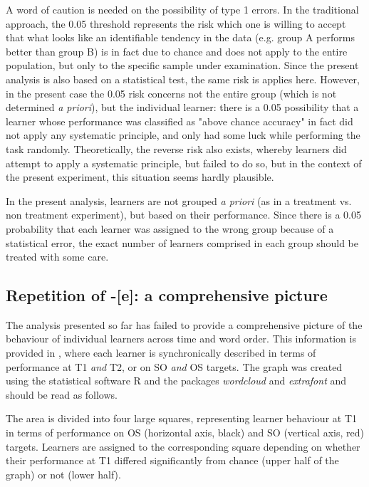 A word of caution is needed on the possibility of type 1 errors. In the traditional approach, the 0.05 threshold represents the risk which one is willing to accept that what looks like an identifiable tendency in the data (e.g. group A performs better than group B) is in fact due to chance and does not apply to the entire population, but only to the specific sample under examination. Since the present analysis is also based on a statistical test, the same risk is applies here. However, in the present case the 0.05 risk concerns not the entire group (which is not determined \textit{a priori}), but the individual learner: there is a 0.05 possibility that a learner whose performance was classified as "above chance accuracy" in fact did not apply any systematic principle, and only had some luck while performing the task randomly. Theoretically, the reverse risk also exists, whereby learners did attempt to apply a systematic principle, but failed to do so, but in the context of the present experiment, this situation seems hardly plausible. 

In the present analysis, learners are not grouped \textit{a priori} (as in a treatment vs. non treatment experiment), but based on their performance. Since there is a 0.05 probability that each learner was assigned to the wrong group because of a statistical error, the exact number of learners comprised in each group should be treated with some care.

\subsection{Repetition of -[e]: a comprehensive picture}\label{sec:04:2.4.1} %
The analysis presented so far has failed to provide a comprehensive picture of the behaviour of individual learners across time and word order. This information is provided in , where each learner is synchronically described in terms of performance at T1 \textit{and} T2, or on SO \textit{and} OS targets. The graph was created using the statistical software R \citep{RCoreTeam2017} and the packages \textit{wordcloud} \citep{Fellows2014} and \textit{extrafont} \citep{Chang2014} and should be read as follows.

The area is divided into four large squares, representing learner behaviour at T1 in terms of performance on OS (horizontal axis, black) and SO (vertical axis, red) targets. Learners are assigned to the corresponding square depending on whether their performance at T1 differed significantly from chance (upper half of the graph) or not (lower half). 

